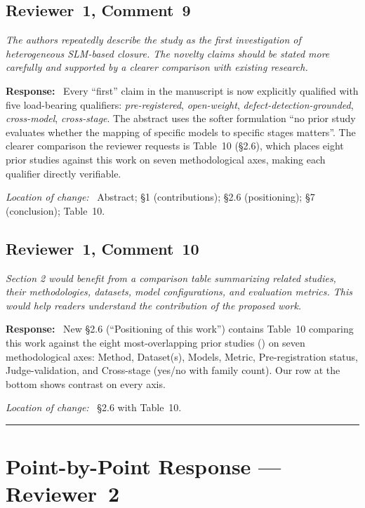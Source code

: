 \documentclass[11pt,a4paper]{article}
\newenvironment{reviewerquote}
  {\begin{tcolorbox}[colback=black!5, colframe=black!15, boxrule=0.3pt,
                     arc=1pt, left=6pt, right=6pt, top=3pt, bottom=3pt,
                     breakable]\itshape\small}
  {\end{tcolorbox}}
\newcommand{\rcomment}[2]{\subsection*{Reviewer~#1, Comment~#2}}
\newcommand{\response}{\noindent\textbf{Response:}\ }
\newcommand{\loc}{\par\smallskip\noindent\textit{Location of change:}\ }
\begin{document}
\rcomment{1}{9}

\begin{reviewerquote}
The authors repeatedly describe the study as the first investigation of heterogeneous SLM-based closure. The novelty claims should be stated more carefully and supported by a clearer comparison with existing research.
\end{reviewerquote}

\response{}
Every ``first'' claim in the manuscript is now explicitly qualified with five load-bearing qualifiers: \emph{pre-registered}, \emph{open-weight}, \emph{defect-detection-grounded}, \emph{cross-model}, \emph{cross-stage}. The abstract uses the softer formulation ``no prior study evaluates whether the mapping of specific models to specific stages matters''. The clearer comparison the reviewer requests is Table~10 (\S2.6), which places eight prior studies against this work on seven methodological axes, making each qualifier directly verifiable.

\loc{} Abstract; \S1 (contributions); \S2.6 (positioning); \S7 (conclusion); Table~10.

\rcomment{1}{10}

\begin{reviewerquote}
Section 2 would benefit from a comparison table summarizing related studies, their methodologies, datasets, model configurations, and evaluation metrics. This would help readers understand the contribution of the proposed work.
\end{reviewerquote}

\response{}
New \S2.6 (``Positioning of this work'') contains Table~10 comparing this work against the eight most-overlapping prior studies (\citet{Allamanis2024RTC, Zhang2025CodingTriangle, Li2024MBCT, Dakhel2024MuTAP, Schafer2024TestPilot, Zheng2023LLMJudge, Han2026CrisisKnowledge, Xiong2025DelphiAgent}) on seven methodological axes: Method, Dataset(s), Models, Metric, Pre-registration status, Judge-validation, and Cross-stage (yes/no with family count). Our row at the bottom shows contrast on every axis.

\loc{} \S2.6 with Table~10.

\begin{center}\rule{0.7\textwidth}{0.4pt}\end{center}

\section*{Point-by-Point Response --- Reviewer~2}
\end{document}
